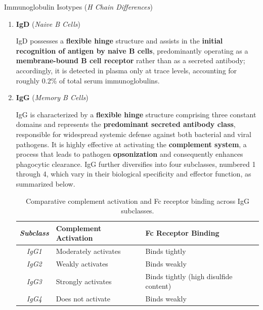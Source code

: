\begin{core}[label=core:isotype]{Immunoglobulin Isotypes (\textit{H Chain Differences})}
\begin{enumerate}
          As with IgG, this potent complement activation drives rapid \textbf{opsonization} of targets and promotes their subsequent phagocytic destruction. Despite its larger size, IgM can also undergo \textbf{transcytosis} across mucosal barriers.

        \item \textbf{IgD} (\textit{Naive B Cells})

          IgD possesses a \textbf{flexible hinge} structure and assists in the \textbf{initial recognition of antigen by naive B cells}, predominantly operating as a \textbf{membrane-bound B cell receptor} rather than as a secreted antibody; accordingly, it is detected in plasma only at trace levels, accounting for roughly 0.2\% of total serum immunoglobulins.

        \item \textbf{IgG} (\textit{Memory B Cells})


          IgG is characterized by a \textbf{flexible hinge} structure comprising three constant domains and represents the \textbf{predominant secreted antibody class}, responsible for widespread systemic defense against both bacterial and viral pathogens. It is highly effective at activating the \textbf{complement system}, a process that leads to pathogen \textbf{opsonization} and consequently enhances phagocytic clearance. IgG further diversifies into four subclasses, numbered 1 through 4, which vary in their biological specificity and effector function, as summarized below.

          \begin{table}[H]
            \centering
            \begin{tabular}{
              >{\itshape}c
              >{\raggedright\arraybackslash}p{3.5cm}
              >{\raggedright\arraybackslash}p{3.5cm}
            }
              \hline
              \textbf{Subclass} & \textbf{Complement Activation} & \textbf{Fc Receptor Binding} \\
              \hline
              IgG1 & Moderately activates & Binds tightly \\
              IgG2 & Weakly activates & Binds weakly \\
              IgG3 & Strongly activates & Binds tightly (high disulfide content) \\
              IgG4 & Does not activate & Binds weakly \\
              \hline
            \end{tabular}
            \caption{Comparative complement activation and Fc receptor binding across IgG subclasses.}
            \label{tab:igg_subclasses}
          \end{table}


\end{enumerate}
\end{core}
